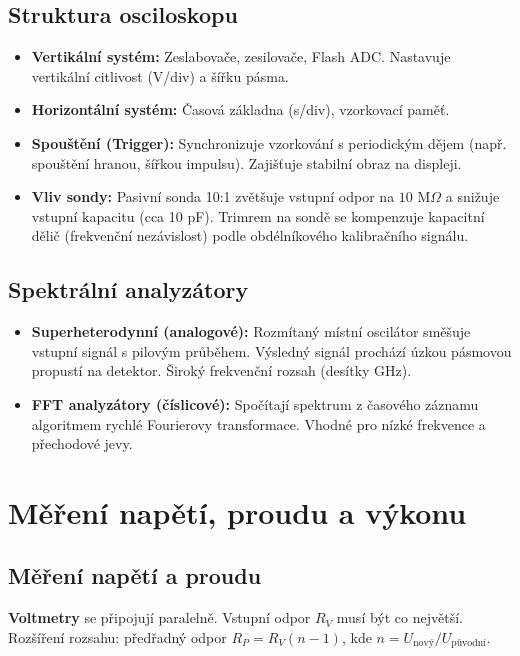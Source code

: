 \subsection{Struktura osciloskopu}
\begin{itemize}
    \item \textbf{Vertikální systém:} Zeslabovače, zesilovače, Flash ADC. Nastavuje vertikální citlivost (V/div) a šířku pásma.
    \item \textbf{Horizontální systém:} Časová základna (s/div), vzorkovací paměť.
    \item \textbf{Spouštění (Trigger):} Synchronizuje vzorkování s periodickým dějem (např. spouštění hranou, šířkou impulsu). Zajišťuje stabilní obraz na displeji.
    \item \textbf{Vliv sondy:} Pasivní sonda 10:1 zvětšuje vstupní odpor na $10\text{ M}\Omega$ a snižuje vstupní kapacitu (cca 10 pF). Trimrem na sondě se kompenzuje kapacitní dělič (frekvenční nezávislost) podle obdélníkového kalibračního signálu.
\end{itemize}

\subsection{Spektrální analyzátory}
\begin{itemize}
    \item \textbf{Superheterodynní (analogové):} Rozmítaný místní oscilátor směšuje vstupní signál s pilovým průběhem. Výsledný signál prochází úzkou pásmovou propustí na detektor. Široký frekvenční rozsah (desítky GHz).
    \item \textbf{FFT analyzátory (číslicové):} Spočítají spektrum z časového záznamu algoritmem rychlé Fourierovy transformace. Vhodné pro nízké frekvence a přechodové jevy.
\end{itemize}

\section{Měření napětí, proudu a výkonu}

\subsection{Měření napětí a proudu}

\textbf{Voltmetry} se připojují paralelně. Vstupní odpor $R_V$ musí být co největší. Rozšíření rozsahu: předřadný odpor $R_P = R_V(n-1)$, kde $n = U_{\text{nový}}/U_{\text{původní}}$.

